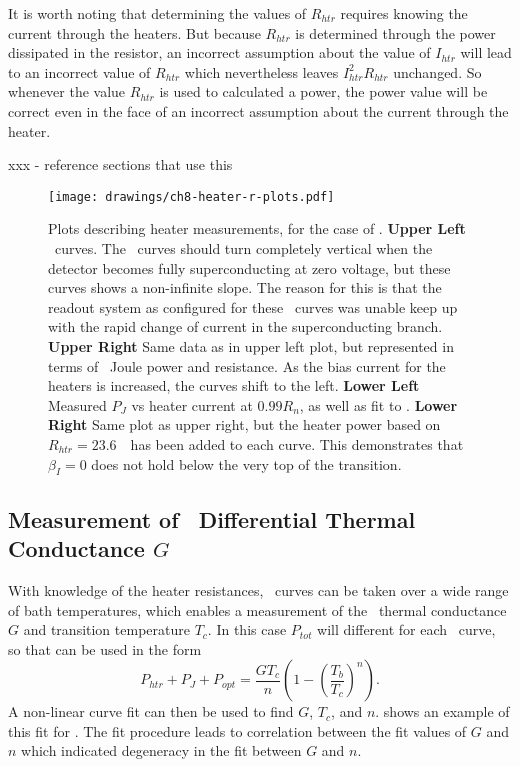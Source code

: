 It is worth noting that determining the values of $R_{htr}$ requires knowing the current through the heaters.
But because $R_{htr}$ is determined through the power dissipated in the resistor, an incorrect assumption about the value of $I_{htr}$ will lead to an incorrect value of $R_{htr}$ which nevertheless leaves $I_{htr}^2 R_{htr}$ unchanged.
So whenever the value $R_{htr}$ is used to calculated a power, the power value will be correct even in the face of an incorrect assumption about the current through the heater.

xxx - reference sections that use this

\begin{figure*}
\texttt{[image: drawings/ch8-heater-r-plots.pdf]}
\caption{Plots describing heater measurements, for the case of .
\textbf{Upper Left} \IV\ curves. The \IV\ curves should turn completely vertical when the detector becomes fully superconducting at zero voltage, but these curves shows a non-infinite slope. The reason for this is that the readout system as configured for these \IV\ curves was unable keep up with the rapid change of current in the superconducting branch.
\textbf{Upper Right} Same data as in upper left plot, but represented in terms of \TES\ Joule power and resistance. As the bias current for the heaters is increased, the curves shift to the left.
\textbf{Lower Left} Measured $P_{J}$ vs heater current at $0.99R_n$, as well as fit to .
\textbf{Lower Right} Same plot as upper right, but the heater power based on $R_{htr} = 23.6$~\Ohm\ has been added to each curve.
This demonstrates that $\beta_I = 0$ does not hold below the very top of the transition.}
\label{fig:heater-r-plots}
\end{figure*}

\subsection{Measurement of \TES\ Differential Thermal Conductance $G$}

With knowledge of the heater resistances, \IV\ curves can be taken over a wide range of bath temperatures, which enables a measurement of the \TES\ thermal conductance $G$ and transition temperature $T_c$.
In this case $P_{tot}$ will different for each \IV\ curve, so that  can be used in the form
\begin{equation}\label{eqn:ch3-g-fit}
P_{htr} + P_J + P_{opt}= \frac{G T_c}{n}\left(1 - \left(\frac{T_b}{T_c}\right)^n\right).
\end{equation}
A non-linear curve fit can then be used to find $G$, $T_c$, and $n$.
 shows an example of this fit for .
The fit procedure leads to correlation between the fit values of $G$ and $n$ which indicated degeneracy in the fit between $G$ and $n$.


